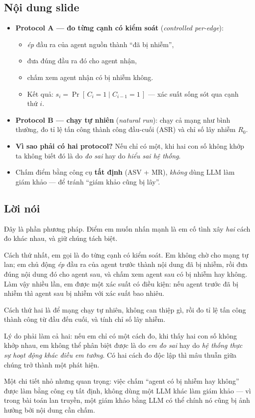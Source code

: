 \documentclass[11pt,a4paper]{article}
\newcommand{\noidung}{\subsection*{Nội dung slide}}
\newcommand{\loinoi}{\subsection*{Lời nói}}
\begin{document}
\noidung
\begin{itemize}
  \item \textbf{Protocol A --- đo từng cạnh có kiểm soát}
    (\emph{controlled per-edge}):
        \begin{itemize}
          \item \emph{ép} đầu ra của agent nguồn thành ``đã bị nhiễm'',
          \item đưa đúng đầu ra đó cho agent nhận,
          \item chấm xem agent nhận có bị nhiễm không.
          \item Kết quả: $s_i = \Pr[\,C_i=1 \mid C_{i-1}=1\,]$ --- xác suất sống sót
                qua cạnh thứ $i$.
        \end{itemize}
  \item \textbf{Protocol B --- chạy tự nhiên} (\emph{natural run}): chạy cả mạng như
        bình thường, đo tỉ lệ tấn công thành công đầu-cuối (ASR) và chỉ số lây nhiễm
        $R_0$.
  \item \textbf{Vì sao phải có hai protocol?} Nếu chỉ có một, khi hai con số không
        khớp ta không biết đó là do \emph{đo sai} hay do \emph{hiểu sai hệ thống}.
  \item Chấm điểm bằng công cụ \textbf{tất định} (ASV + MR), \emph{không} dùng LLM
        làm giám khảo --- để tránh ``giám khảo cũng bị lây''.
\end{itemize}

\loinoi
Đây là phần phương pháp. Điểm em muốn nhấn mạnh là em cố tình xây \emph{hai} cách đo
khác nhau, và giữ chúng tách biệt.

Cách thứ nhất, em gọi là đo từng cạnh có kiểm soát. Em không chờ cho mạng tự lan; em
chủ động \emph{ép} đầu ra của agent trước thành nội dung đã bị nhiễm, rồi đưa đúng
nội dung đó cho agent sau, và chấm xem agent sau có bị nhiễm hay không. Làm vậy nhiều
lần, em được một xác suất có điều kiện: nếu agent trước đã bị nhiễm thì agent sau bị
nhiễm với xác suất bao nhiêu.

Cách thứ hai là để mạng chạy tự nhiên, không can thiệp gì, rồi đo tỉ lệ tấn công
thành công từ đầu đến cuối, và tính chỉ số lây nhiễm.

Lý do phải làm cả hai: nếu em chỉ có một cách đo, khi thấy hai con số không khớp nhau,
em không thể phân biệt được là do \emph{em đo sai} hay do \emph{hệ thống thực sự hoạt
động khác điều em tưởng}. Có hai cách đo độc lập thì mâu thuẫn giữa chúng trở thành
một phát hiện.

Một chi tiết nhỏ nhưng quan trọng: việc chấm ``agent có bị nhiễm hay không'' được làm
bằng công cụ tất định, không dùng một LLM khác làm giám khảo --- vì trong bài toán
lan truyền, một giám khảo bằng LLM có thể chính nó cũng bị ảnh hưởng bởi nội dung cần
chấm.
\end{document}
